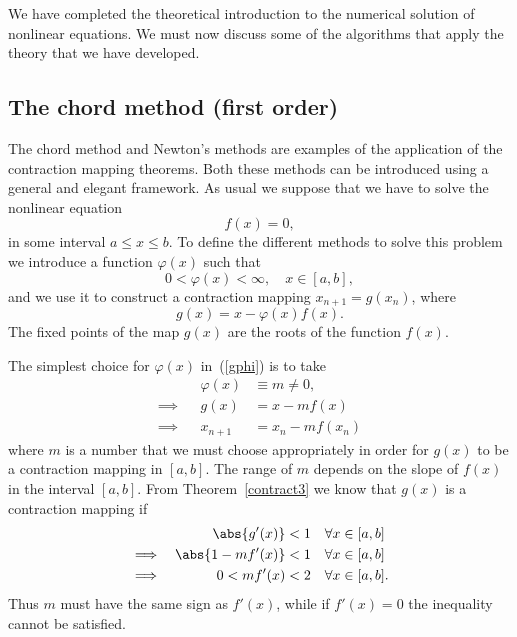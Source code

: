 We  have completed the  theoretical  introduction to the
numerical solution of nonlinear  equations.  We must now discuss  some
of the  algorithms  that apply  the   theory that  we have  developed.

\subsection{The chord method (first order)}

The chord method and Newton's methods are examples of the application
of the contraction mapping theorems.  Both these methods can be
introduced using a general and elegant framework.  As usual we suppose
that we have to solve the nonlinear equation
%
\begin{equation*}
  f(x) = 0,
\end{equation*}
%
in some interval $a \le x \le b$.  To define the different methods to
solve this problem we introduce a function $\varphi(x)$ such that
%
\begin{equation}
  0 < \varphi(x) < \infty, \quad x \in [a,b] ,
 \label{phibound}
\end{equation}
%
and we use it to construct a contraction mapping $x_{n+1} =
g(x_n)$, where
%
\begin{equation}
  g(x) = x - \varphi(x) f(x).   \label{gphi}
\end{equation}
%
The fixed points of the map $g(x)$ are the roots of the function
$f(x)$.

\smallskip

The simplest choice for $\varphi(x)$ in~(\ref{gphi}) is to take
%
\begin{align}
  && \varphi(x) & \equiv m \ne 0, \\
  \implies && g(x) & = x - m f(x) \\
  \implies && x_{n+1} & = x_n - m f(x_n)
  \label{phichord}
\end{align}
%
where $m$ is a number that we must choose appropriately in order for
$g(x)$ to be a contraction mapping in $[a,b]$.   The range of $m$
depends on the slope of $f(x)$ in the interval $[a,b]$.   From
Theorem~\ref{contract3} we know that $g(x)$ is a contraction mapping if
%
\begin{align}
  & &  \abs{ g'(x) } & < 1 &  \forall x &\in [a,b] \nonumber
  \\
  \implies &&
  \abs{ 1 - m f'(x) } & < 1 & \forall x &\in [a,b] \nonumber
  \\
  \implies && 0 < m f'(x) & < 2 & \forall x &\in [a,b] . \label{ineq_chord}
\end{align}
%
Thus $m$ must have the same sign as $f'(x)$, while if $f'(x)=0$ the
inequality cannot be satisfied.

